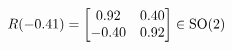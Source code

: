 \documentclass[preview]{standalone}
\begin{document}
\begin{align*}
\special{dvisvgm:raw <g id='unique000'>}R(-0.41) = \begin{bmatrix} 0.92 & 0.40 \\ -0.40 & 0.92 \end{bmatrix} \in \text{SO}(2)\special{dvisvgm:raw </g>}
\end{align*}
\end{document}
